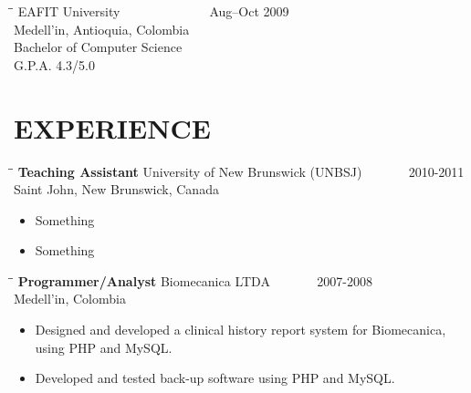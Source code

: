 \documentclass{res}
\begin{document}
\begin{resume}
   \begin{tabbing}
   \hspace{2.3in}\= \hspace{2.6in}\= \kill %
        EAFIT University\> ~~~~~~ \> ~~~~~~ Aug--Oct 2009\\
        Medell\a'in, Antioquia, Colombia\\
        Bachelor of Computer Science\\
        G.P.A. 4.3/5.0\\
   \end{tabbing}\vspace{-20pt}      %

\section{EXPERIENCE}
   \vspace{0.05 in}	

   \begin{tabbing}
   \hspace{2.3in}\= \hspace{2.6in}\= \kill %
    {\bf Teaching Assistant} \>University of New Brunswick (UNBSJ)\> ~~~~~~ 2010-2011\\
                             \>Saint John, New Brunswick, Canada
   \end{tabbing}\vspace{-5pt}      %

   \begin{itemize}
       \item Something
       \item Something
   \end{itemize}

   
   \begin{tabbing}
   \hspace{2.3in}\= \hspace{2.6in}\= \kill %
    {\bf Programmer/Analyst} \>Biomecanica LTDA\> ~~~~~~ 2007-2008\\
                             \>Medell\a'in, Colombia
   \end{tabbing}\vspace{-5pt}      %

   \begin{itemize}
       \item Designed and developed a clinical history report system for Biomecanica, using PHP and MySQL.
       \item Developed and tested back-up software using PHP and MySQL.
   \end{itemize}


\end{resume}
\end{document}
